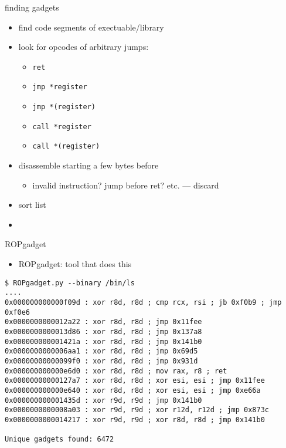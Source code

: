 
\begin{frame}{finding gadgets}
    \begin{itemize}
        \item find code segments of exectuable/library
        \item look for opcodes of arbitrary jumps:
            \begin{itemize}
            \item \texttt{ret}
            \item \texttt{jmp *register}
            \item \texttt{jmp *(register)}
            \item \texttt{call *register}
            \item \texttt{call *(register)}
        \end{itemize}
        \item disassemble starting a few bytes before
            \begin{itemize}
            \item invalid instruction? jump before ret? etc. --- discard
            \end{itemize}
        \item sort list
        \vspace{.5cm}
    \item {}
    \end{itemize}
\end{frame}

\begin{frame}[fragile,label=ROPgadgetEx1]{ROPgadget}
    \begin{itemize}
    \item ROPgadget: tool that does this
    \end{itemize}
\begin{lstlisting}[language={},style=small]
$ ROPgadget.py --binary /bin/ls
....
0x000000000000f09d : xor r8d, r8d ; cmp rcx, rsi ; jb 0xf0b9 ; jmp 0xf0e6
0x0000000000012a22 : xor r8d, r8d ; jmp 0x11fee
0x0000000000013d86 : xor r8d, r8d ; jmp 0x137a8
0x000000000001421a : xor r8d, r8d ; jmp 0x141b0
0x0000000000006aa1 : xor r8d, r8d ; jmp 0x69d5
0x00000000000099f0 : xor r8d, r8d ; jmp 0x931d
0x000000000000e6d0 : xor r8d, r8d ; mov rax, r8 ; ret
0x00000000000127a7 : xor r8d, r8d ; xor esi, esi ; jmp 0x11fee
0x000000000000e640 : xor r8d, r8d ; xor esi, esi ; jmp 0xe66a
0x000000000001435d : xor r9d, r9d ; jmp 0x141b0
0x0000000000008a03 : xor r9d, r9d ; xor r12d, r12d ; jmp 0x873c
0x0000000000014217 : xor r9d, r9d ; xor r8d, r8d ; jmp 0x141b0

Unique gadgets found: 6472
\end{lstlisting}
\end{frame}

